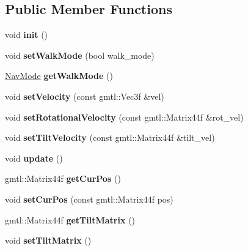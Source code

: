 \subsection*{Public Member Functions}
\begin{DoxyCompactItemize}
\item 
\hypertarget{class_osg_navigator_a69d88ec484a106499df853997e35871f}{
void {\bfseries init} ()}
\label{class_osg_navigator_a69d88ec484a106499df853997e35871f}

\item 
\hypertarget{class_osg_navigator_a976ff8bbf7a5dd18335109ebb47af5bb}{
void {\bfseries setWalkMode} (bool walk\_\-mode)}
\label{class_osg_navigator_a976ff8bbf7a5dd18335109ebb47af5bb}

\item 
\hypertarget{class_osg_navigator_a0a7f62dd07aa60a70267d078123cce51}{
\hyperlink{class_osg_navigator_af7e369e107a95154084e59e0a85aa18f}{NavMode} {\bfseries getWalkMode} ()}
\label{class_osg_navigator_a0a7f62dd07aa60a70267d078123cce51}

\item 
\hypertarget{class_osg_navigator_ad7d7ef685cf1d228f2bc78429dd59cd3}{
void {\bfseries setVelocity} (const gmtl::Vec3f \&vel)}
\label{class_osg_navigator_ad7d7ef685cf1d228f2bc78429dd59cd3}

\item 
\hypertarget{class_osg_navigator_a0c5e66bf67b018a382ca58b96a111a40}{
void {\bfseries setRotationalVelocity} (const gmtl::Matrix44f \&rot\_\-vel)}
\label{class_osg_navigator_a0c5e66bf67b018a382ca58b96a111a40}

\item 
\hypertarget{class_osg_navigator_a8deba34ea812ac54e25f835d7053967e}{
void {\bfseries setTiltVelocity} (const gmtl::Matrix44f \&tilt\_\-vel)}
\label{class_osg_navigator_a8deba34ea812ac54e25f835d7053967e}

\item 
\hypertarget{class_osg_navigator_ae249d2ee76ed909d09ee806a0ceb2844}{
void {\bfseries update} ()}
\label{class_osg_navigator_ae249d2ee76ed909d09ee806a0ceb2844}

\item 
\hypertarget{class_osg_navigator_a3f815c0542764b5f2e4d91d56bc79c83}{
gmtl::Matrix44f {\bfseries getCurPos} ()}
\label{class_osg_navigator_a3f815c0542764b5f2e4d91d56bc79c83}

\item 
\hypertarget{class_osg_navigator_a76d7c7f19c8341cef3f7da9f07589890}{
void {\bfseries setCurPos} (const gmtl::Matrix44f pos)}
\label{class_osg_navigator_a76d7c7f19c8341cef3f7da9f07589890}

\item 
\hypertarget{class_osg_navigator_ae638bfd8aa567a671f9b712e1adf79b9}{
gmtl::Matrix44f {\bfseries getTiltMatrix} ()}
\label{class_osg_navigator_ae638bfd8aa567a671f9b712e1adf79b9}

\item 
\hypertarget{class_osg_navigator_a26b2ede1e2371e7da4dbc2217c73426e}{
void {\bfseries setTiltMatrix} ()}
\label{class_osg_navigator_a26b2ede1e2371e7da4dbc2217c73426e}

\end{DoxyCompactItemize}


